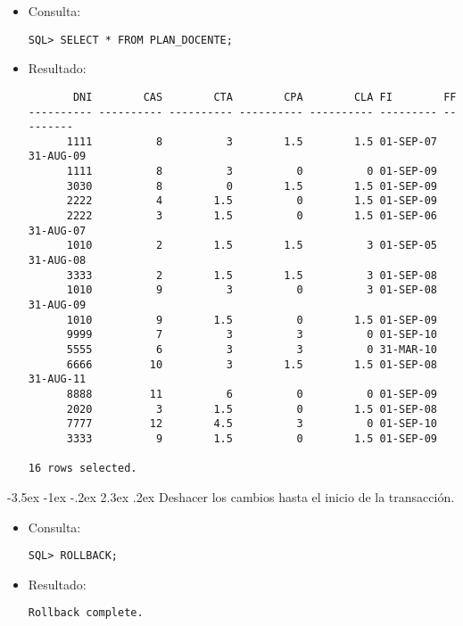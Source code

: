 \documentclass[11pt]{report}
\makeatletter
\renewcommand\chapter{\@startsection{chapter}{0}{\z@}%
    {-3.5ex \@plus -1ex \@minus -.2ex}%
    {2.3ex \@plus.2ex}%
    {\normalfont\Large\bfseries}}
\makeatother
\begin{document}
\begin{itemize}
  \item Consulta:
  \begin{verbatim}
SQL> SELECT * FROM PLAN_DOCENTE;
  \end{verbatim}

  \newpage

  \item{Resultado:}
  \begin{verbatim}
       DNI        CAS        CTA        CPA        CLA FI        FF                                 
---------- ---------- ---------- ---------- ---------- --------- ---------                          
      1111          8          3        1.5        1.5 01-SEP-07 31-AUG-09                          
      1111          8          3          0          0 01-SEP-09                                    
      3030          8          0        1.5        1.5 01-SEP-09                                    
      2222          4        1.5          0        1.5 01-SEP-09                                    
      2222          3        1.5          0        1.5 01-SEP-06 31-AUG-07                          
      1010          2        1.5        1.5          3 01-SEP-05 31-AUG-08                          
      3333          2        1.5        1.5          3 01-SEP-08                                    
      1010          9          3          0          3 01-SEP-08 31-AUG-09                          
      1010          9        1.5          0        1.5 01-SEP-09                                    
      9999          7          3          3          0 01-SEP-10                                    
      5555          6          3          3          0 31-MAR-10                                    
      6666         10          3        1.5        1.5 01-SEP-08 31-AUG-11                          
      8888         11          6          0          0 01-SEP-09                                    
      2020          3        1.5          0        1.5 01-SEP-08                                    
      7777         12        4.5          3          0 01-SEP-10                                    
      3333          9        1.5          0        1.5 01-SEP-09                                    

16 rows selected.
  \end{verbatim}
\end{itemize}

\chapter{Deshacer los cambios hasta el inicio de la transacción.}
\begin{itemize}
  \item Consulta:
  \begin{verbatim}
SQL> ROLLBACK;
  \end{verbatim}
  \item{Resultado:}
  \begin{verbatim}
Rollback complete.
  \end{verbatim}
\end{itemize}
\end{document}
